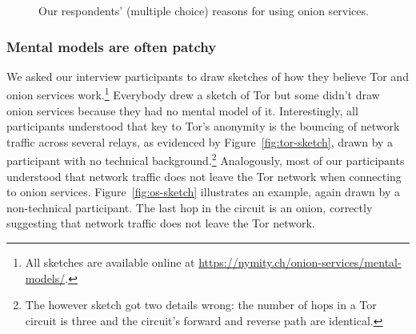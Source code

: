 \begin{figure}[t]
    \centering
    
    \caption{Our respondents' (multiple choice) reasons for using onion
    services.}
    \label{fig:onion-usage}
\end{figure}

\subsubsection{Mental models are often patchy}

We asked our interview participants to draw sketches of how they believe Tor and
onion services work.\footnote{All sketches are available online at
\url{https://nymity.ch/onion-services/mental-models/}.}   Everybody drew a
sketch of Tor but some didn't draw onion services because they had no mental
model of it.  Interestingly, all participants understood that key to Tor's
anonymity is the bouncing of network traffic across several relays, as evidenced
by Figure~\ref{fig:tor-sketch}, drawn by a participant with no technical
background.\footnote{The however sketch got two details wrong: the number of
hops in a Tor circuit is three and the circuit's forward and reverse path are
identical.} Analogously, most of our participants understood that network
traffic does not leave the Tor network when connecting to onion services.
Figure~\ref{fig:os-sketch} illustrates an example, again drawn by a
non-technical participant.  The last hop in the circuit is an onion, correctly
suggesting that network traffic does not leave the Tor network.

